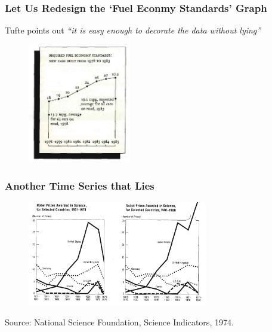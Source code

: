 \documentclass[notes, aspectratio=1610]{beamer}
\begin{document}
\begin{frame}
	\frametitle{Let Us Redesign the `Fuel Econmy Standards' Graph}

	Tufte points out \emph{``it is easy enough to decorate the data 
	without lying''}
	\begin{figure}
		\begin{small}
			\begin{center}
				\includegraphics[width=0.4\textwidth]{
					images/redo_fuel_economy.png
					}
			\end{center}
		\end{small}
	\end{figure}
	
\end{frame}

\begin{frame}
	\frametitle{Another Time Series that Lies}
	\begin{figure}
		\begin{small}
			\begin{center}
				\includegraphics[width=0.7\textwidth]{
					images/nsf.png
					}
			\end{center}
		\end{small}
	\end{figure}

	\footnotesize
	Source: National Science Foundation, Science Indicators, 1974.

\end{frame}
\end{document}
